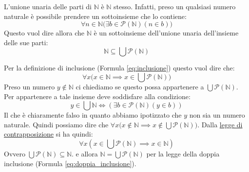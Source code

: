 \begin{example}
	L'unione unaria delle parti di $\mathbb{N}$ è $\mathbb{N}$ stesso. Infatti, preso un qualsiasi numero naturale è possibile prendere un sottoinsieme che lo contiene:
	\begin{displaymath}
		\forall n \in \mathbb{N} \bigl(\exists b \in \mathcal{P}(\mathbb{N})(n \in b)\bigr)
	\end{displaymath}
	Questo vuol dire allora che $\mathbb{N}$ è un sottoinsieme dell'unione unaria dell'insieme delle sue parti: $$\mathbb{N} \subseteq \bigcup \mathcal{P}(\mathbb{N})$$
	
	Per la definizione di inclusione (Formula \ref{eq:inclusione}) questo vuol dire che:
	\begin{displaymath}
		\forall x \bigl( x \in \mathbb{N} \implies x \in \bigcup \mathcal{P}(\mathbb{N}) \bigr)
	\end{displaymath}
	Preso un numero $y \notin \mathbb{N}$ ci chiediamo se questo possa appartenere a $\bigcup \mathcal{P} (\mathbb{N})$. Per appartenere a tale insieme deve soddisfare alla condizione:
	\begin{displaymath}
		y \in \bigcup \mathbb{N} \iff (\exists b \in \mathcal{P}(\mathbb{N})(y \in b))
	\end{displaymath}
	Il che è chiaramente falso in quanto abbiamo ipotizzato che $y$ non sia un numero naturale. Quindi possiamo dire che $\forall x \bigl( x \notin \mathbb{N} \implies x \notin \bigcup \mathcal{P}(\mathbb{N}) \bigr)$. Dalla \hyperlink{contrapposizione}{legge di contrapposizione} si ha quindi:$$\forall x (x \in \bigcup \mathcal{P}(\mathbb{N}) \implies x \in \mathbb{N})$$ Ovvero $\bigcup \mathcal{P}(\mathbb{N}) \subseteq \mathbb{N}$. e allora $\mathbb{N} = \bigcup \mathcal{P}( \mathbb{N})$ per la legge della doppia inclusione (Formula \ref{eq:doppia_inclusione}).
\end{example}



